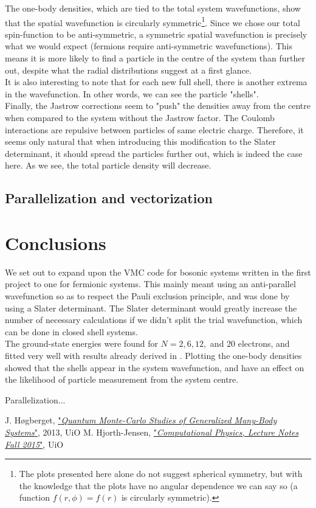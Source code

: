 \documentclass[english, a4paper]{article}
\begin{document}
	The one-body densities, which are tied to the total system wavefunctions, show that the spatial wavefunction is circularly symmetric\footnote{The plots presented here alone do not suggest spherical symmetry, but with the knowledge that the plots have no angular dependence we can say so (a function $f(r,\phi) = f(r)$ is circularly symmetric).}.
	Since we chose our total spin-function to be anti-symmetric, a symmetric spatial wavefunction is precisely what we would expect (fermions require anti-symmetric wavefunctions). This means it is more likely to find a particle in the centre of the system than further out, despite what the radial distributions suggest at a first glance.\\
	It is also interesting to note that for each new full shell, there is another extrema in the wavefunction. In other words, we can see the particle "shells".\\
	
	Finally, the Jastrow corrections seem to "push" the densities away from the centre when compared to the system without the Jastrow factor. The Coulomb interactions are repulsive between particles of same electric charge. Therefore, it seems only natural that when introducing this modification to the Slater determinant, it should spread the particles further out, which is indeed the case here. As we see, the total particle density will decrease.
	
	\subsection{Parallelization and vectorization}
	
	
	\section{Conclusions}
	We set out to expand upon the VMC code for bosonic systems written in the first project to one for fermionic systems. This mainly meant using an anti-parallel wavefunction so as to respect the Pauli exclusion principle, and was done by using a Slater determinant. The Slater determinant would greatly increase the number of necessary calculations if we didn't split the trial wavefunction, which can be done in closed shell systems.\\
	The ground-state energies were found for $N=2,6,12,$ and $20$ electrons, and fitted very well with results already derived in \cite{H_Msc}. Plotting the one-body densities showed that the shells appear in the system wavefunction, and have an effect on the likelihood of particle measurement from the system centre.
	
	Parallelization...
	
	\begin{thebibliography}{9}
		J. Høgberget, \href{https://www.duo.uio.no/handle/10852/37167}{"\emph{Quantum Monte-Carlo Studies of Generalized Many-Body Systems}"}, 2013, UiO
		M. Hjorth-Jensen, \href{https://github.com/CompPhysics/ComputationalPhysics2}{"\emph{Computational Physics, Lecture Notes Fall 2015}"}, UiO
	\end{thebibliography}
	
\end{document}
